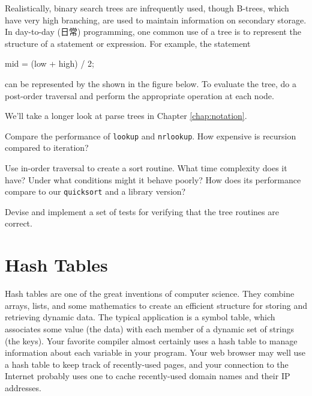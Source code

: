 Realistically, binary search trees are infrequently used, though B-trees,
which have very high branching, are used to maintain information on
secondary storage. In day-to-day (日常) programming, one common use of a
tree is to represent the structure of a statement or expression. For
example, the statement
\begin{wellcode}
    mid = (low + high) / 2;
\end{wellcode}
can be represented by the  shown in the figure
below. To evaluate the tree, do a post-order traversal and perform the
appropriate operation at each node.
\begin{center}
\end{center}
We'll take a longer look at parse trees in Chapter \ref{chap:notation}.

\begin{exercise}
Compare the performance of \verb'lookup' and \verb'nrlookup'. How expensive
is recursion compared to iteration?
\end{exercise}

\begin{exercise}
Use in-order traversal to create a sort routine. What time complexity does
it have? Under what conditions might it behave poorly? How does its
performance compare to our \verb'quicksort' and a library version?
\end{exercise}

\begin{exercise}
Devise and implement a set of tests for verifying that the tree routines
are correct.
\end{exercise}

\section{Hash Tables}
\label{sec:hash_tables}

Hash tables are one of the great inventions of computer science. They
combine arrays, lists, and some mathematics to create an efficient
structure for storing and retrieving dynamic data. The typical application
is a symbol table, which associates some value (the data) with each member
of a dynamic set of strings (the keys). Your favorite compiler almost
certainly uses a hash table to manage information about each variable in
your program. Your web browser may well use a hash table to keep track of
recently-used pages, and your connection to the Internet probably uses one
to cache recently-used domain names and their IP addresses.

